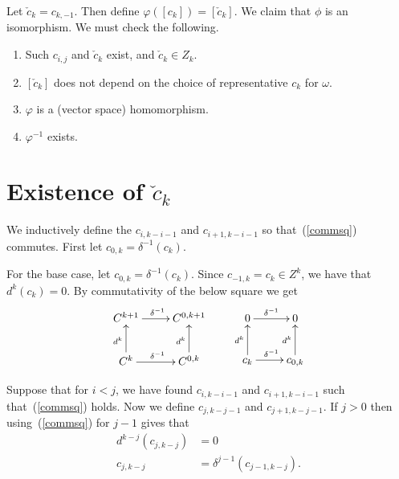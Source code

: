 \documentclass[12pt]{article}
\theoremstyle{norm}
\newcommand{\de}[0]{\delta}
\newcommand{\ph}[0]{\varphi}
\newcommand{\om}[0]{\omega}
\begin{document}
Let $\check c_k=c_{k,-1}$.
Then define $\ph([c_k])=[\check c_{k}]$. We claim that $\phi$ is an isomorphism. We must check the following.
\begin{enumerate}
\item Such $c_{i,j}$ and $\check c_k$ exist, and $\check{c}_k\in Z_k$.
\item $[\check c_k]$ does not depend on the choice of representative $c_k$ for $\om$.
\item $\ph$ is a (vector space) homomorphism.
\item $\ph^{-1}$ exists.
\end{enumerate}
\section{Existence of $\check c_k$}
We inductively define the $c_{i,k-i-1}$ and $c_{i+1,k-i-1}$ so that~(\ref{commsq}) commutes. First let $c_{0,k}=\de^{-1}(c_k)$.

For the base case, let $c_{0,k}=\de^{-1}(c_k)$. Since $c_{-1,k}=c_k\in Z^k$, we have that $d^k(c_k)=0$. By commutativity of the below square we get
\[
\xymatrix{
C^{k+1}\ar[r]^{\de^{-1}} & C^{0,k+1}\\
C^k\ar[u]^{d^k} \ar[r]^{\de^{-1}}& C^{0,k}\ar[u]^{d^k}
}\qquad 
\xymatrix{
0\ar[r]^{\de^{-1}} & 0\\
c_k \ar[u]^{d^k}\ar[r]^{\de^{-1}}& c_{0,k}\ar[u]^{d^k}
}
\]

Suppose that for $i<j$, we have found $c_{i,k-i-1}$ and $c_{i+1,k-i-1}$ such that~(\ref{commsq}) holds. Now we define $c_{j,k-j-1}$ and $c_{j+1,k-j-1}$. If $j>0$ then using~(\ref{commsq}) for $j-1$ gives that 
\begin{align}
\label{e1}
d^{k-j}(c_{j,k-j})&=0\\
\label{e2}
c_{j,k-j}&=\de^{j-1}(c_{j-1,k-j}).
\end{align}
%
\end{document}
